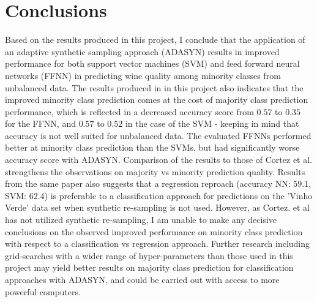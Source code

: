 \documentclass[%
oneside,                 %
final,                   %
10pt]{article}
\begin{document}
\section{Conclusions} \label{conclusions}
Based on the results produced in this project, I conclude that the application of an adaptive synthetic sampling approach (ADASYN) results in improved performance for both support vector machines (SVM) and feed forward neural networks (FFNN) in predicting wine quality among minority classes from unbalanced data. The results produced in in this project also indicates that the improved minority class prediction comes at the cost of majority class prediction performance, which is reflected in a decreased accuracy score from $0.57$ to $0.35$ for the FFNN, and $0.57$ to $0.52$ in the case of the SVM - keeping in mind that accuracy is not well suited for unbalanced data. The evaluated FFNNs performed better at minority class prediction than the SVMs, but had significantly worse accuracy score with ADASYN. Comparison of the results to those of Cortez et al. \citep{CortezPaulo} strengthens the observations on majority vs minority prediction quality. Results from the same paper also suggests that a regression reproach (accuracy NN: $59.1$, SVM: $62.4$) is preferable to a classification approach for predictions on the 'Vinho Verde' data set when synthetic re-sampling is not used. However, as Cortez. et al has not utilized synthetic re-sampling, I am unable to make any decisive conclusions on the observed improved performance on minority class prediction with respect to a classification vs regression approach. Further research including grid-searches with a wider range of hyper-parameters than those used in this project may yield better results on majority class prediction for classification approaches with ADASYN, and could be carried out with access to more powerful computers. 



 \label{refer}

\end{document}
